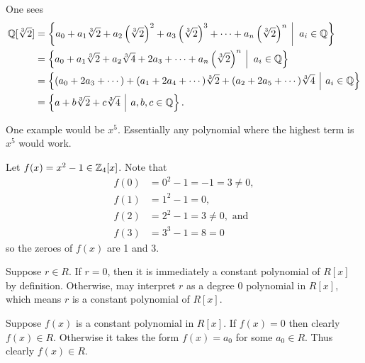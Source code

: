 \begin{questions}
    \item One sees
    \begin{align*}
        \Q[\sqrt[3]{2}] &= \left\{a_0 + a_1\sqrt[3]{2} + a_2\left(\sqrt[3]{2}\right)^2 + a_3\left(\sqrt[3]{2}\right)^3 + \cdots + a_n\left(\sqrt[3]{2}\right)^n \vert a_i \in \Q\right\}\\
        &= \left\{a_0 + a_1\sqrt[3]{2} + a_2\sqrt[3]{4} + 2a_3 + \cdots + a_n\left(\sqrt[3]{2}\right)^n \vert a_i \in \Q\right\}\\
        &= \left\{(a_0 + 2a_3 + \cdots) + (a_1 + 2a_4 + \cdots)\sqrt[3]{2} + (a_2 + 2a_5 + \cdots)\sqrt[3]{4} \vert a_i \in \Q\right\}\\
        &= \left\{a + b\sqrt[3]{2} + c\sqrt[3]{4} \vert a,b,c \in \Q\right\}.
    \end{align*}

    \item One example would be $x^5$. Essentially any polynomial where the highest term is $x^5$ would work.

    \item Let $f(x) = x^2 - 1 \in \mathbb{Z}_4[x]$. Note that
    \begin{align*}
        f(0) &= 0^2 - 1 = -1 = 3 \neq 0,\\
        f(1) &= 1^2 - 1 = 0,\\
        f(2) &= 2^2 - 1 = 3 \neq 0, \text{ and}\\
        f(3) &= 3^3 - 1 = 8 = 0
    \end{align*}
    so the zeroes of $f(x)$ are 1 and 3.

    \item \begin{partquestions}{\alph*}
        \item Suppose $r \in R$. If $r = 0$, then it is immediately a constant polynomial of $R[x]$ by definition. Otherwise, may interpret $r$ as a degree 0 polynomial in $R[x]$, which means $r$ is a constant polynomial of $R[x]$.

        \item Suppose $f(x)$ is a constant polynomial in $R[x]$. If $f(x) = 0$ then clearly $f(x) \in R$. Otherwise it takes the form $f(x) = a_0$ for some $a_0 \in R$. Thus clearly $f(x) \in R$.
    \end{partquestions}


\end{questions}
